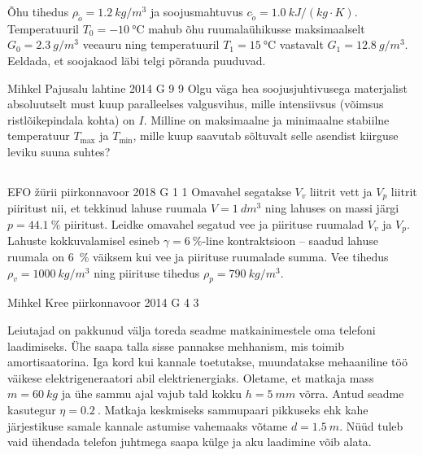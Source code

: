 \documentclass[11pt, twoside]{article}
\begin{document}
{{Õhu tihedus $\rho_{\tilde{o}}=\SI{1.2}{kg/m^{3}}$ ja soojusmahtuvus
$c_{\tilde{o}}=\SI{1.0}{kJ/\left(kg\cdot K\right)}$. Temperatuuril
$T_{0}=\SI{-10}{\celsius}$ mahub õhu ruumalaühikusse maksimaalselt
$G_{0}=\SI{2.3}{g/m^{3}}$ veeauru ning temperatuuril $T_{1}=\SI{15}{\celsius}$
vastavalt $G_{1}=\SI{12.8}{g/m^{3}}.$ Eeldada, et soojakaod läbi
telgi põranda puuduvad.
\fi
}

{Mihkel Pajusalu} %
{lahtine} %
{2014} %
{G 9} %
{9} %
{
\ifStatement
Olgu väga hea soojusjuhtivusega materjalist absoluutselt must kuup paralleelses valgusvihus, mille intensiivsus (võimsus ristlõikepindala kohta) on $I$. Milline on maksimaalne ja minimaalne stabiilne temperatuur $T_\text{max}$ ja $T_\text{min}$, mille kuup saavutab sõltuvalt selle asendist kiirguse leviku suuna suhtes?
\fi
}
\newpage\subsection{\protect{}}

{EFO žürii} %
{piirkonnavoor} %
{2018} %
{G 1} %
{1} %
{
\ifStatement
Omavahel segatakse $V_v$ liitrit vett ja $V_p$ liitrit piiritust nii, et tekkinud lahuse ruumala $V=\SI{1}{dm^3}$ ning lahuses on massi järgi $p=\SI{44,1}{\percent}$ piiritust. Leidke omavahel segatud vee ja piirituse ruumalad $V_v$ ja $V_p$. Lahuste kokkuvalamisel esineb $\gamma = \SI{6}{\percent}$-line kontraktsioon -- saadud lahuse ruumala on \SI{6}{\percent} väiksem kui vee ja piirituse ruumalade summa. Vee tihedus $\rho_v=\SI{1000}{kg/m^3}$ ning piirituse tihedus $\rho_p=\SI{790}{kg/m^3}$.
\fi
}

{Mihkel Kree} %
{piirkonnavoor} %
{2014} %
{G 4} %
{3} %
{
\ifStatement
Leiutajad on pakkunud välja toreda seadme matkainimestele oma telefoni laadimiseks. Ühe saapa talla sisse pannakse mehhanism, mis toimib amortisaatorina. Iga kord kui kannale toetutakse, muundatakse mehaaniline töö väikese elektrigeneraatori abil elektrienergiaks. Oletame, et matkaja mass $m=\SI{60}{kg}$ ja ühe sammu ajal vajub tald kokku 
$h=\SI{5}{mm}$ võrra. Antud seadme kasutegur $\eta = \SI{0,2}{}$. Matkaja keskmiseks sammupaari pikkuseks ehk kahe järjestikuse samale kannale astumise vahemaaks võtame $d=\SI{1.5}{m}$. Nüüd tuleb vaid ühendada telefon juhtmega saapa külge ja aku laadimine võib alata.

}}
\end{document}
